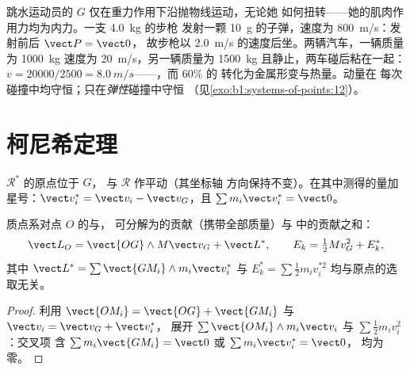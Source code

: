 \begin{example}[跳水、反冲与碰撞]\label{ex:b1:systems-of-points:cm}
跳水运动员的 $G$ 仅在重力作用下沿抛物线运动，无论她
如何扭转——她的肌肉作用力均为内力。一支 \qty{4.0}{kg} 的步枪
发射一颗 \qty{10}{g} 的子弹，速度为 \qty{800}{m/s}：发射前后 $\vect P = \vect 0$，
故步枪以 \qty{2.0}{m/s} 的速度后坐。两辆汽车，一辆质量为 \qty{1000}{kg}
速度为 \qty{20}{m/s}，另一辆质量为 \qty{1500}{kg} 且静止，两车碰后粘在一起：$v =
20000/2500 = \qty{8.0}{m/s}$——，而 $60\%$ 的
转化为金属形变与热量。动量在
每次碰撞中均守恒；只在\emph{弹性}碰撞中守恒
（见\cref{exo:b1:systems-of-points:12}）。
\end{example}

\section{柯尼希定理}

\begin{definition}[质心参考系]\label{def:b1:systems-of-points:barycentric}
\emph{} $\mathcal R^*$ 的原点位于 $G$，
与 $\mathcal R$ 作平动（其坐标轴
方向保持不变）。在其中测得的量加星号：$\vect v_i^*
= \vect v_i - \vect v_G$，且 $\sum m_i\vect v_i^* = \vect 0$。
\end{definition}

\begin{theorem}[柯尼希定理]\label{thm:b1:systems-of-points:koenig}
质点系对点 $O$ 的与，
可分解为的贡献（携带全部质量）与
中的贡献之和：
\[
\vect L_O = \vect{OG}\wedge M\vect v_G + \vect L^*, \qquad
E_k = \tfrac12 Mv_G^2 + E_k^*,
\]
其中 $\vect L^* = \sum\vect{GM_i}\wedge m_i\vect v_i^*$ 与 $E_k^* = \sum\tfrac12
m_iv_i^{*2}$ 均与原点的选取无关。
\end{theorem}

\begin{proof}
利用 $\vect{OM_i} = \vect{OG} + \vect{GM_i}$ 与 $\vect v_i = \vect v_G + \vect v_i^*$，
展开 $\sum\vect{OM_i}\wedge m_i\vect v_i$ 与 $\sum\tfrac12 m_iv_i^2$：交叉项
含 $\sum m_i\vect{GM_i} = \vect 0$ 或 $\sum m_i\vect v_i^* = \vect 0$，
均为零。
\end{proof}

